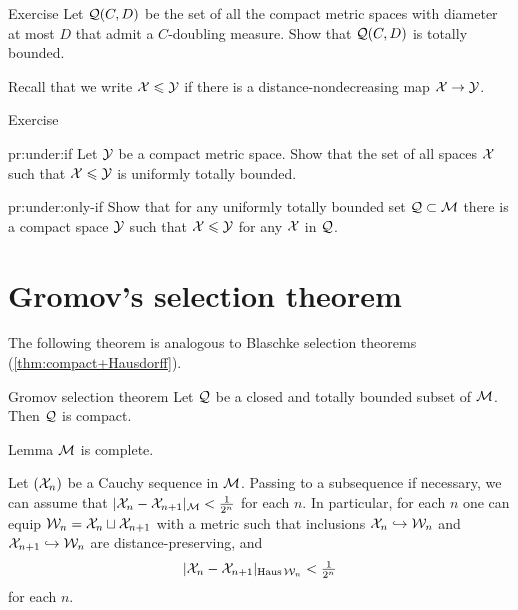 \begin{thm}{Exercise}\label{pr:doubling}
Let $\mathcal{Q}(C,D)$ be the set of all the compact metric spaces with diameter at most $D$ that admit a $C$-doubling measure.
Show that $\mathcal{Q}(C,D)$ is totally bounded.
\end{thm}

Recall that we write $\mathcal{X}\leqslant\mathcal{Y}$ if there is a distance-nondecreasing map $\mathcal{X}\to\mathcal{Y}$.

\begin{thm}{Exercise}\label{pr:under}

\begin{subthm}{pr:under:if}
Let $\mathcal{Y}$ be a compact metric space.
Show that the set of all spaces $\mathcal{X}$ such that $\mathcal{X}\leqslant\mathcal{Y}$
is uniformly totally bounded.
\end{subthm}

\begin{subthm}{pr:under:only-if}
Show that for any uniformly totally bounded set $\mathcal{Q}\subset\mathcal{M}$ there is a compact space $\mathcal{Y}$
such that $\mathcal{X}\leqslant\mathcal{Y}$ for any $\mathcal{X}$ in $\mathcal{Q}$.
\end{subthm}

\end{thm}

\section{Gromov's selection theorem}

The following theorem is analogous to Blaschke selection theorems (\ref{thm:compact+Hausdorff}).

\begin{thm}{Gromov selection theorem}\label{thm:gromov-compactness}%
Let $\mathcal{Q}$ be a closed and totally bounded subset of $\mathcal{M}$.
Then $\mathcal{Q}$ is compact.
\end{thm}

\begin{thm}{Lemma}
$\mathcal{M}$ is complete.
\end{thm}

Let $(\mathcal{X}_n)$ be a Cauchy sequence in $\mathcal{M}$.
Passing to a subsequence if necessary, 
we can assume that $|\mathcal{X}_n-\mathcal{X}_{n+1}|_{\mathcal{M}}<\tfrac1{2^n}$ for each $n$.
In particular, for each $n$ one can equip $\mathcal{W}_n=\mathcal{X}_n \sqcup \mathcal{X}_{n+1}$ with a metric such that
inclusions $\mathcal{X}_n\hookrightarrow \mathcal{W}_n$ and $\mathcal{X}_{n+1}\hookrightarrow \mathcal{W}_n$ are distance-preserving,
and $$|\spc{X}_n-\spc{X}_{n+1}|_{\Haus\spc{W}_n}\z<\tfrac1{2^n}$$
for each $n$.

